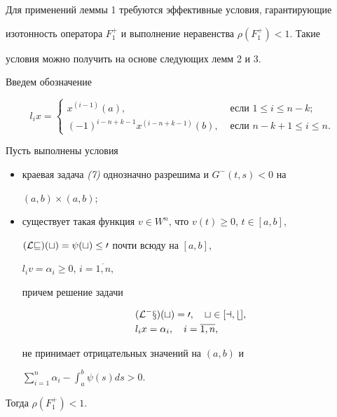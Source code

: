  


Для применений леммы 1 требуются эффективные условия, гарантирующие 


изотонность оператора $F^+_1$ и выполнение неравенства $\rho(F^+_1)<1$. Такие 


условия можно получить на основе следующих лемм 2 и 3. 


 


Введем обозначение 


$$ 


l_ix= 


\begin{cases} 


x^{(i-1)}(a), &\text{ если }1\le i\le n-k;\\ 


(-1)^{i-n+k-1}x^{(i-n+k-1)}(b), &\text{ если }n-k+1\le i \le n. 


\end{cases} 


$$ 


 


\begin{lem} Пусть выполнены условия 


\begin{itemize} 


\item[1)] краевая задача {\em (7)} однозначно разрешима и $G^-(t,s)<0$ на 


$(a,b)\times(a,b)$; 


\item[2)] существует такая функция $v\in W^n$, что $v(t)\ge 0$, $t\in[a,b]$, 


$(\cal Lv)(t)=\psi(t)\le 0$ почти всюду на $[a,b]$, 


$l_iv=\alpha_i\ge 0$, $i=\overline{1,n}$,


причем решение задачи 


\begin{align} 


\begin{split} 


& (\cal L^-x)(t)=0,\quad t\in[a,b],\\ 


& l_ix=\alpha_i,\quad i=\overline{1,n}, 


\end{split} 


\end{align} 


не принимает отрицательных значений на $(a,b)$ и 


$\sum^n_{i=1}\alpha_i-\int^b_a\psi(s)ds>0$. 


\end{itemize} 


Тогда $\rho(F^+_1)<1$. 


\end{lem} 


